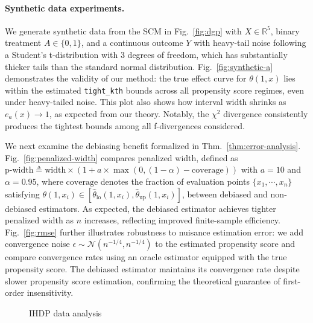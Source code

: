 \paragraph{Synthetic data experiments.} We generate synthetic data from the SCM in Fig.~\ref{fig:dgp} with $X\in\mathbb{R}^5$, binary treatment $A\in\{0,1\}$, and a continuous outcome $Y$ with heavy-tail noise following a Student's t-distribution with 3 degrees of freedom, which has substantially thicker tails than the standard normal distribution. Fig.~\ref{fig:synthetic-a} demonstrates the validity of our method: the true effect curve for $\theta(1,x)$ lies within the estimated \texttt{tight\_kth} bounds across all propensity score regimes, even under heavy-tailed noise. This plot also shows how interval width shrinks as $e_a(x) \rightarrow 1$, as expected from our theory. Notably, the $\chi^2$ divergence consistently produces the tightest bounds among all f-divergences considered.

We next examine the debiasing benefit formalized in Thm.~\ref{thm:error-analysis}. Fig.~\ref{fig:penalized-width} compares penalized width, defined as $\text{p-width}\triangleq \mathrm{width} \times (1+ a \times \max (0, (1-\alpha)-\mathrm{coverage}))$ with $a=10$ and $\alpha=0.95$, where $\mathrm{coverage}$ denotes the fraction of evaluation points $\{x_1,\cdots,x_n\}$ satisfying $\theta(1,x_i) \in [\widehat{\theta}_{\mathrm{lo}}(1,x_i),\widehat{\theta}_{\mathrm{up}}(1,x_i)]$, between debiased and non-debiased estimators. As expected, the debiased estimator achieves tighter penalized width as $n$ increases, reflecting improved finite-sample efficiency. Fig.~\ref{fig:rmse} further illustrates robustness to nuisance estimation error: we add convergence noise $\epsilon \sim \mathcal{N}(n^{-1/4}, n^{-1/4})$ to the estimated propensity score and compare convergence rates using an oracle estimator equipped with the true propensity score. The debiased estimator maintains its convergence rate despite slower propensity score estimation, confirming the theoretical guarantee of first-order insensitivity.


\begin{figure}
    \vspace{-0.3in}
    \centering
    \caption{IHDP data analysis}
    \label{fig:ribbon-idhp}
\end{figure}

